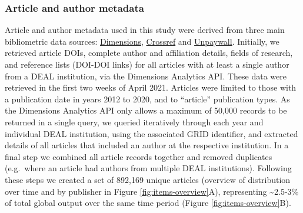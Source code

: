 \documentclass[
]{article}
\begin{document}
\hypertarget{article-and-author-metadata}{%
\subsubsection{Article and author metadata}\label{article-and-author-metadata}}

Article and author metadata used in this study were derived from three main bibliometric data sources: \href{https://www.dimensions.ai/}{Dimensions}, \href{http://crossref.org/}{Crossref} and \href{https://unpaywall.org/}{Unpaywall}. Initially, we retrieved article DOIs, complete author and affiliation details, fields of research, and reference lists (DOI-DOI links) for all articles with at least a single author from a DEAL institution, via the Dimensions Analytics API. These data were retrieved in the first two weeks of April 2021. Articles were limited to those with a publication date in years 2012 to 2020, and to ``article'' publication types. As the Dimensions Analytics API only allows a maximum of 50,000 records to be returned in a single query, we queried iteratively through each year and individual DEAL institution, using the associated GRID identifier, and extracted details of all articles that included an author at the respective institution. In a final step we combined all article records together and removed duplicates (e.g.~where an article had authors from multiple DEAL institutions). Following these steps we created a set of 892,169 unique articles (overview of distribution over time and by publisher in Figure \ref{fig:items-overview}A), representing \textasciitilde2.5-3\% of total global output over the same time period (Figure \ref{fig:items-overview}B).
\end{document}
